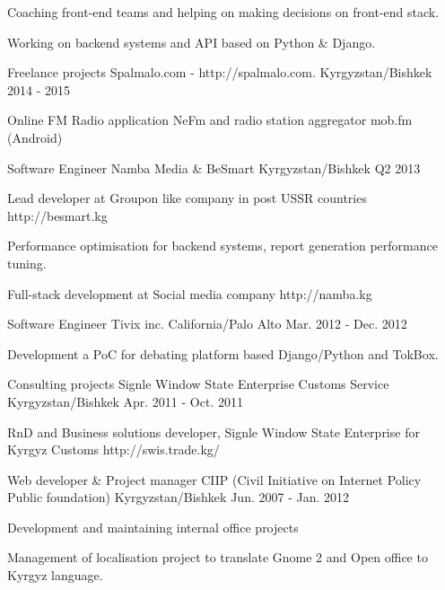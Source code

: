 \begin{cventries}
{\begin{cvitems}
        \item {Coaching front-end teams and helping on making decisions on front-end stack.}
        \item {Working on backend systems and API based on Python \& Django.}
      \end{cvitems}
    }
  \cventry
    {Freelance projects}
    {Spalmalo.com - http://spalmalo.com.}
    {Kyrgyzstan/Bishkek}
    {2014 - 2015}
    {
      \begin{cvitems}
        \item {Online FM Radio application NeFm and radio station aggregator mob.fm (Android)}
      \end{cvitems}
    }
  \cventry
    {Software Engineer}
    {Namba Media \& BeSmart}
    {Kyrgyzstan/Bishkek}
    {Q2 2013}
    {
      \begin{cvitems}
        \item {Lead developer at Groupon like company in post USSR countries http://besmart.kg}
        \item {Performance optimisation for backend systems, report generation performance tuning.}
        \item {Full-stack development at Social media company http://namba.kg}
      \end{cvitems}
    }
  \cventry
    {Software Engineer}
    {Tivix inc.}
    {California/Palo Alto}
    {Mar. 2012 - Dec. 2012}
    {
      \begin{cvitems}
        \item {Development a PoC for debating platform based Django/Python and TokBox.}
      \end{cvitems}
    }
  \cventry
    {Consulting projects}
    {Signle Window State Enterprise Customs Service}
    {Kyrgyzstan/Bishkek}
    {Apr. 2011 - Oct. 2011}
    {
      \begin{cvitems}
        \item {RnD and Business solutions developer, Signle Window State Enterprise for Kyrgyz Customs http://swis.trade.kg/}
      \end{cvitems}
    }

  \cventry
    {Web developer \& Project manager}
    {CIIP (Civil Initiative on Internet Policy Public foundation)}
    {Kyrgyzstan/Bishkek}
    {Jun. 2007 - Jan. 2012}
    {
      \begin{cvitems}
        \item {Development and maintaining internal office projects}
        \item {Management of localisation project to translate Gnome 2 and Open office to Kyrgyz language.}
      \end{cvitems}
    }
\end{cventries}
